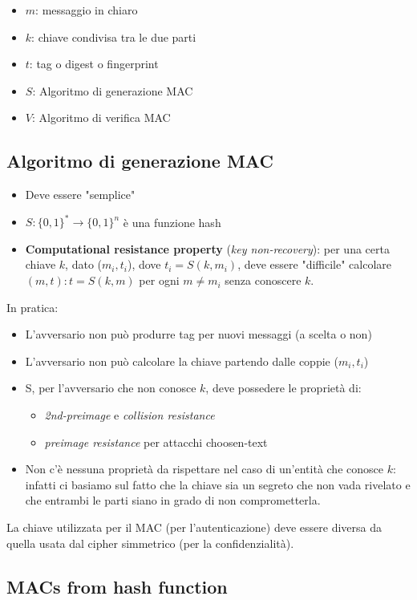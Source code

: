 \documentclass[a4paper,12pt]{article}
\begin{document}
\begin{itemize}
	\item $m$: messaggio in chiaro
	\item $k$: chiave condivisa tra le due parti
	\item $t$: tag o digest o fingerprint
	\item $S$: Algoritmo di generazione MAC
	\item $V$: Algoritmo di verifica MAC
\end{itemize}

\subsection{Algoritmo di generazione MAC}
\begin{itemize}
	\item Deve essere "semplice"
	\item $S : \{0,1\}^* \rightarrow \{0,1\}^n$ è una funzione hash				
	\item \textbf{Computational resistance property} (\textit{key non-recovery}): per una certa chiave $k$, dato ($m_i, t_i$), dove $t_i = S(k, m_i)$, deve essere "difficile" calcolare $(m, t) : t = S(k, m)$ per ogni $m \neq m_i$ senza conoscere $k$.
\end{itemize}
In pratica:
\begin{itemize}
	\item L'avversario non può produrre tag per nuovi messaggi (a scelta o non)
	\item L'avversario non può calcolare la chiave partendo dalle coppie ($m_i, t_i$)
	\item S, per l'avversario che non conosce $k$, deve possedere le proprietà di:
	\begin{itemize}
		\item \textit{2nd-preimage} e \textit{collision resistance}
		\item \textit{preimage resistance} per attacchi choosen-text
	\end{itemize}
	\item Non c'è nessuna proprietà da rispettare nel caso di un'entità che conosce $k$:
	infatti ci basiamo sul fatto che la chiave sia un segreto che non vada rivelato e che entrambi le parti siano in grado di non comprometterla.
\end{itemize}
La chiave utilizzata per il MAC (per l'autenticazione) deve essere diversa da quella usata dal cipher simmetrico (per la confidenzialità).

\subsection{MACs from hash function}
\end{document}
